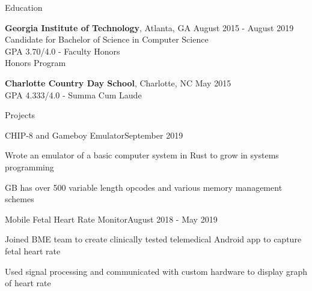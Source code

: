 \documentclass{resume} %
\begin{document}
\begin{rSection}{Education}

  \textbf{Georgia Institute of Technology}, Atlanta, GA \hfill {August 2015 - August 2019}
  \\ Candidate for Bachelor of Science in Computer Science
  \\ GPA 3.70/4.0 - Faculty Honors
  \\ Honors Program

  \textbf{Charlotte Country Day School}, Charlotte, NC \hfill {May 2015}
  \\ GPA 4.333/4.0 - Summa Cum Laude

\end{rSection}


\begin{rSection}{Projects}

  \begin{rSubsection}{CHIP-8 and Gameboy Emulator}{September 2019}{}{}
  \item Wrote an emulator of a basic computer system in Rust to grow in systems programming
  \item GB has over 500 variable length opcodes and various memory management schemes
  \end{rSubsection}

  \begin{rSubsection}{Mobile Fetal Heart Rate Monitor}{August 2018 - May 2019}{}{}
  \item Joined BME team to create clinically tested telemedical Android
    app to capture fetal heart rate
  \item Used signal processing and communicated with custom hardware to display
    graph of heart rate
  \end{rSubsection}

\end{rSection}


\end{document}
